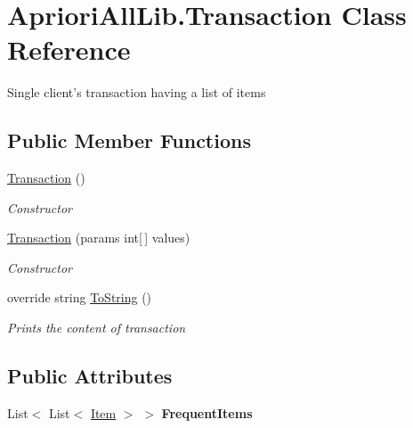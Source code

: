 \hypertarget{class_apriori_all_lib_1_1_transaction}{\section{Apriori\-All\-Lib.\-Transaction Class Reference}
\label{class_apriori_all_lib_1_1_transaction}
}


Single client's transaction having a list of items  


\subsection*{Public Member Functions}
\begin{DoxyCompactItemize}
\item 
\hyperlink{class_apriori_all_lib_1_1_transaction_adad35699bc55fcba5ee7ad28d34bdf53}{Transaction} ()
\begin{DoxyCompactList}\small\item\em Constructor \end{DoxyCompactList}\item 
\hyperlink{class_apriori_all_lib_1_1_transaction_a582a1d655d1c0d452a5e5f0b972688dd}{Transaction} (params int\mbox{[}$\,$\mbox{]} values)
\begin{DoxyCompactList}\small\item\em Constructor \end{DoxyCompactList}\item 
override string \hyperlink{class_apriori_all_lib_1_1_transaction_acee1a8846d87f949c63110f7e6eabfe0}{To\-String} ()
\begin{DoxyCompactList}\small\item\em Prints the content of transaction \end{DoxyCompactList}\end{DoxyCompactItemize}
\subsection*{Public Attributes}
\begin{DoxyCompactItemize}
\item 
\hypertarget{class_apriori_all_lib_1_1_transaction_a2ee6b2f74a842edb646ec8f99e5f7b8f}{List$<$ List$<$ \hyperlink{class_apriori_all_lib_1_1_item}{Item} $>$ $>$ {\bfseries Frequent\-Items}}\label{class_apriori_all_lib_1_1_transaction_a2ee6b2f74a842edb646ec8f99e5f7b8f}

\end{DoxyCompactItemize}
